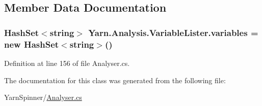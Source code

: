 \subsection{Member Data Documentation}
\hypertarget{a00183_a64ed6c3394c474b6cf5804a35f560746}{
\subsubsection[{variables}]{\setlength{\rightskip}{0pt plus 5cm}Hash\-Set$<$string$>$ Yarn.\-Analysis.\-Variable\-Lister.\-variables = new Hash\-Set$<$string$>$()\hspace{0.3cm}{\ttfamily [private]}}}\label{a00183_a64ed6c3394c474b6cf5804a35f560746}


Definition at line 156 of file Analyser.\-cs.



The documentation for this class was generated from the following file\-:\begin{DoxyCompactItemize}
\item 
Yarn\-Spinner/\hyperlink{a00293}{Analyser.\-cs}\end{DoxyCompactItemize}
